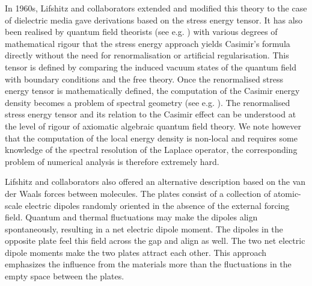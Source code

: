 In 1960s, Lifshitz and collaborators extended and modified this theory to the case of dielectric media \cite{dzyaloshinskii1961general} 
gave derivations based on the stress energy tensor. It has also been realised by quantum field theorists  
(see e.g. \cite{brown1969vacuum, dzyaloshinskii1961general, deutsch1979boundary, kay1979casimir, scharf1992casimir}) with various degrees of mathematical rigour that 
the stress energy approach yields Casimir's formula directly without the need for renormalisation or artificial regularisation.
This tensor is defined by comparing the induced vacuum states of the quantum field with boundary conditions and the free theory. 
Once the renormalised stress energy tensor is mathematically defined, the computation of the Casimir energy density becomes a problem of spectral 
geometry (see e.g. \cite{fulling2007vacuum}). The renormalised stress energy tensor and its relation to the Casimir effect can be understood at the 
level of rigour of axiomatic algebraic quantum field theory. We note however that the computation of the local energy density is non-local and requires 
some knowledge of the spectral resolution of the Laplace operator, the corresponding problem of numerical analysis is therefore extremely hard.

Lifshitz and collaborators also offered an alternative description based on the van der Waals forces between molecules.
The plates consist of a collection of atomic-scale electric dipoles randomly oriented in the absence of the external forcing field. Quantum and thermal 
fluctuations may make the dipoles align spontaneously, resulting in a net electric dipole moment. The dipoles in the opposite plate feel this field
across the gap and align as well. The two net electric dipole moments make the two plates attract each other. This approach emphasizes the 
influence from the materials more than the fluctuations in the empty space between the plates.

